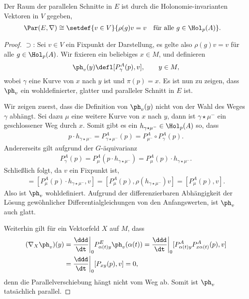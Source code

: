 \documentclass[%
	paper=a5,%
	fleqn,%
	DIV=18,%
	BCOR=0mm,
	fontsize=11pt,
	titlepage=false,%
	bibliography=totoc,
	DIV=18,%
	twoside=true,
	pdftitle=Riemannsche Geometrie,
	pdfauthor=Uwe Semmelmann,
	numbers=noendperiod]%
	{scrbook}
\begin{document}
\begin{prop}
Der Raum der parallelen Schnitte in $E$ ist durch die Holonomie-invarianten Vektoren in $V$ gegeben,
\begin{align*}
\Par(E,\nabla) &\cong \setdef{v\in V}{\rho(g)v = v\quad \text{für alle }g\in \Hol_{p}(A)}.
\end{align*}
\end{prop}
\begin{proof}
$\supset$:
Sei $v\in V$ ein Fixpunkt der Darstellung, es gelte also $\rho(g)v=v$ für alle $g\in \Hol_{p}(A)$. Wir fixieren ein beliebiges $x\in M$, und definieren
\begin{align*}
\ph_{v}(y) \defl [P_{\gamma}^A(p),v],\qquad y\in M,
\end{align*}
wobei $\gamma$ eine Kurve von $x$ nach $y$ ist und $\pi(p)=x$. Es ist nun zu zeigen, dass $\ph_{v}$ ein wohldefinierter, glatter und paralleler Schnitt in $E$ ist.

Wir zeigen zuerst, dass die Definition von $\ph_{v}(y)$ nicht von der Wahl des Weges $\gamma$ abhängt. Sei dazu $\mu$ eine weitere Kurve von $x$ nach $y$, dann ist $\gamma\star \mu^-$ ein geschlossener Weg durch $x$.
Somit gibt es ein $h_{\gamma\star \mu^-}\in \Hol_{p}(A)$ so, dass 
\begin{align*}
p\cdot h_{\gamma\star \mu^-} = P_{\gamma\star \mu^-}^A(p) = P_{\mu^-}^A\circ P_{\gamma}^A(p).
\end{align*}
Andererseits gilt aufgrund der $G$-äquivarianz
\begin{align*}
P_{\gamma}^A(p) =P_{\mu}^A(p\cdot h_{\gamma\star \mu^-}) =  P_{\mu}^A(p)\cdot h_{\gamma\star \mu^-}.
\end{align*}
Schließlich folgt, da $v$ ein Fixpunkt ist,
\begin{align*}
[P_{\gamma}^A(p),v] = [P_{\mu}^A(p)\cdot h_{\gamma\star \mu^-},v] = 
[P_{\mu}^A(p),\rho(h_{\gamma\star \mu^-})v] = 
[P_{\mu}^A(p),v].
\end{align*}
Also ist $\ph_{v}$ wohldefiniert. Aufgrund der differenzierbaren Abhängigkeit der Lösung gewöhnlicher Differentialgleichungen von den Anfangswerten, ist $\ph_{v}$ auch glatt.

Weiterhin gilt für ein Vektorfeld $X$ auf $M$, dass
\begin{align*}
(\nabla_{X}\ph_{v})(y) &= \frac{\ddd}{\dt}\bigg|_{0} P_{\alpha(t)y}^E\ph_{v}(\alpha(t))
= \frac{\ddd}{\dt}\bigg|_{0} [P_{\alpha(t)y}^AP^A_{x\alpha(t)}(p),v]\\
&= \frac{\ddd}{\dt}\bigg|_{0} [P_{xy}(p),v] = 0,
\end{align*}
denn die Parallelverschiebung hängt nicht vom Weg ab.
Somit ist $\ph_{v}$ tatsächlich parallel.


\end{proof}
\end{document}
